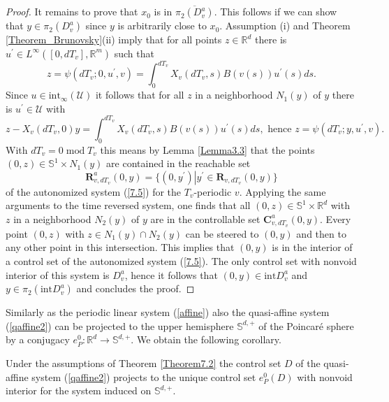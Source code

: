\documentclass{siamltex}%
\begin{document}
\begin{proof}
It remains to prove that $x_{0}$ is in $\overline{\pi_{2}(D_{v}^{a})}$. This
follows if we can show that $y\in\pi_{2}(D_{v}^{a})$ since $y$ is arbitrarily
close to $x_{0}$. Assumption (i) and Theorem \ref{Theorem_Brunovsky}(ii) imply
that for all points $z\in\mathbb{R}^{d}$ there is $u^{\prime}\in L^{\infty
}([0,dT_{v}],\mathbb{R}^{m})$ such that
\[
z=\psi(dT_{v};0,u^{\prime},v)=\int_{0}^{dT_{v}}X_{v}(dT_{v},s)B(v(s))u^{\prime
}(s)ds.
\]
Since $u\in\mathrm{int}_{\infty}(\mathcal{U})$ it follows that for all $z$ in
a neighborhood $N_{1}(y)$ of $y$ there is $u^{\prime}\in\mathcal{U}$ with%
\[
z-X_{v}(dT_{v},0)y=\int_{0}^{dT_{v}}X_{v}(dT_{v},s)B(v(s))u^{\prime
}(s)ds,\text{ hence }z=\psi(dT_{v};y,u^{\prime},v).
\]
With $dT_{v}=0\operatorname{mod}T_{v}$ this means by Lemma \ref{Lemma3.3} that
the points $(0,z)\in\mathbb{S}^{1}\times N_{1}(y)$ are contained in the
reachable set%
\[
\mathbf{R}_{v,dT_{v}}^{a}(0,y)=\{(0,y^{\prime})\left\vert y^{\prime}%
\in\mathbf{R}_{v,dT_{v}}(0,y)\right.  \}
\]
of the autonomized system (\ref{7.5}) for the $T_{v}$-periodic $v$. Applying
the same arguments to the time reversed system, one finds that all
$(0,z)\in\mathbb{S}^{1}\times\mathbb{R}^{d}$ with $z$ in a neighborhood
$N_{2}(y)$ of $y$ are in the controllable set $\mathbf{C}_{v,dT_{v}}^{a}%
(0,y)$. Every point $(0,z)$ with $z\in N_{1}(y)\cap N_{2}(y)$ can be steered
to $(0,y)$ and then to any other point in this intersection. This implies that
$(0,y)$ is in the interior of a control set of the autonomized system
(\ref{7.5}). The only control set with nonvoid interior of this system is
$D_{v}^{a}$, hence it follows that $(0,y)\in\mathrm{int}D_{v}^{a}$ and
$y\in\pi_{2}(\mathrm{int}D_{v}^{a})$ and concludes the proof.
\end{proof}

Similarly as the periodic linear system (\ref{affine}) also the quasi-affine
system (\ref{qaffine2}) can be projected to the upper hemisphere
$\mathbb{S}^{d,+}$ of the Poincar\'{e} sphere by a conjugacy $e_{P}%
^{0}:\mathbb{R}^{d}\rightarrow\mathbb{S}^{d,+}$. We obtain the following corollary.

\begin{corollary}
Under the assumptions of Theorem \ref{Theorem7.2} the control set $D$ of the
quasi-affine system (\ref{qaffine2}) projects to the unique control set
$e_{P}^{0}(D)$ with nonvoid interior for the system induced on $\mathbb{S}%
^{d,+}$.
\end{corollary}
\end{document}
